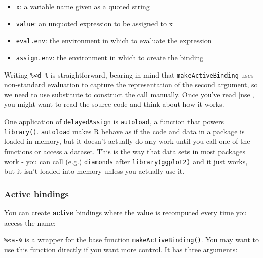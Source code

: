 \documentclass[oneside]{book}
\newenvironment{Shaded}{}{}
\newcommand{\KeywordTok} [1]{\textcolor[rgb]{0.00,0.44,0.13}{{#1}}}
\newcommand{\DecValTok}  [1]{\textcolor[rgb]{0.25,0.63,0.44}{{#1}}}
\newcommand{\StringTok}  [1]{\textcolor[rgb]{0.25,0.44,0.63}{{#1}}}
\newcommand{\CommentTok} [1]{\textcolor[rgb]{0.38,0.63,0.69}{{#1}}}
\newcommand{\NormalTok}  [1]{{#1}}
\renewcommand{\hyperref}[2][???]{\autoref{#1}}
\begin{document}
\begin{itemize}
\itemsep1pt\parskip0pt
\item
  \texttt{x}: a variable name given as a quoted string
\item
  \texttt{value}: an unquoted expression to be assigned to x
\item
  \texttt{eval.env}: the environment in which to evaluate the expression
\item
  \texttt{assign.env}: the environment in which to create the binding
\end{itemize}

Writing \texttt{\%\textless{}d-\%} is straightforward, bearing in mind
that \texttt{makeActiveBinding} uses non-standard evaluation to capture
the representation of the second argument, so we need to use substitute
to construct the call manually. Once you've read
\hyperref[nse]{non-standard evaluation}, you might want to read the
source code and think about how it works.

One application of \texttt{delayedAssign} is \texttt{autoload}, a
function that powers \texttt{library()}. \texttt{autoload} makes R
behave as if the code and data in a package is loaded in memory, but it
doesn't actually do any work until you call one of the functions or
access a dataset. This is the way that data sets in most packages work -
you can call (e.g.) \texttt{diamonds} after \texttt{library(ggplot2)}
and it just works, but it isn't loaded into memory unless you actually
use it.

\subsubsection{Active bindings}\label{active-bindings}

You can create \textbf{active} bindings where the value is recomputed
every time you access the name:

\begin{Shaded}
\end{Shaded}

\texttt{\%\textless{}a-\%} is a wrapper for the base function
\texttt{makeActiveBinding()}. You may want to use this function directly
if you want more control. It has three arguments:
\end{document}

